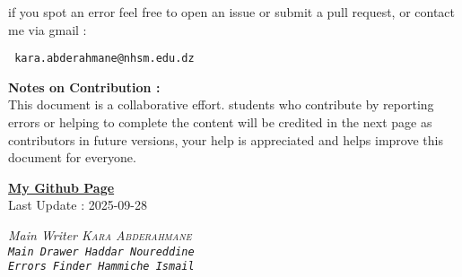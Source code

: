 \documentclass{report}
\begin{document}
\begin{titlepage}
  \begin{center}
    if you spot an error feel free to open an issue or
    submit a pull request, or contact me
    via gmail :
  \end{center}
  \begin{center}
    \normalfont
    \texttt{
      \large kara.abderahmane@nhsm.edu.dz
      \normalfont
    }
  \end{center}
  \noindent \textbf{Notes on Contribution : } \\
  This document is a collaborative effort.
  students who contribute by reporting errors or helping to complete the content
  will be credited in the next page as contributors in future versions,
  your help is appreciated and helps improve this document for everyone.
\end{titlepage}
\begin{titlepage}
  \newpage
  \normalfont
  \vfill
  \begin{center}
    \href{https://github.com/Kapa9102}{\textbf{My Github Page}}\\
    \vspace{0.8cm}
    Last Update : 2025-09-28
  \end{center}
  \begin{tcolorbox}[enhanced, colback=yellow!70!orange!20!white, sharp corners, boxrule=1pt,
    attach boxed title to top center = {yshift = -10pt, xshift = 0pt}, colbacktitle=yellow!30!orange!20!white,
    boxed title style = {boxrule=0pt, arc=4pt}, title=\sc\textcolor{black}{Contributors}]
    \begin{center}
      \it Main Writer \hfill \normalfont  \textsc{Kara Abderahmane}  \\
      \vspace{0.5cm}
      \tt Main Drawer \hfill \normalfont  \tt{Haddar Noureddine}  \\
      \vspace{0.5cm}
      \tt Errors Finder \hfill \normalfont  \tt{Hammiche Ismail}  \\
    \end{center}
  \end{tcolorbox}
\end{titlepage}

\tableofcontents



% 
% 
  
\end{document}
